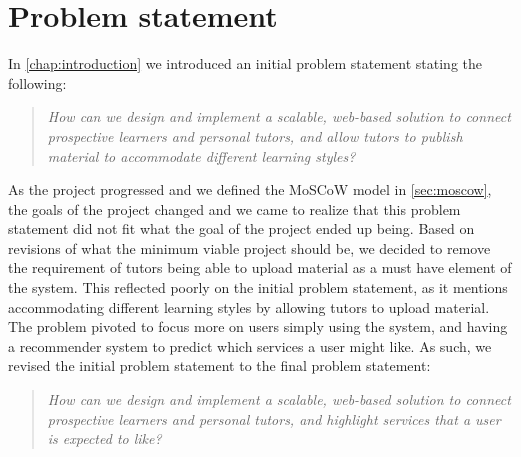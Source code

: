 \section{Problem statement}\label{sec:problemstatement}
In \autoref{chap:introduction} we introduced an initial problem statement stating the following:
\begin{quote}
    \textit{How can we design and implement a scalable, web-based solution to connect prospective learners and personal tutors, and allow tutors to publish material to accommodate different learning styles?}
\end{quote}
As the project progressed and we defined the MoSCoW model in \autoref{sec:moscow}, the goals of the project changed and we came to realize that this problem statement did not fit what the goal of the project ended up being.
Based on revisions of what the minimum viable project should be, we decided to remove the requirement of tutors being able to upload material as a must have element of the system.
This reflected poorly on the initial problem statement, as it mentions accommodating different learning styles by allowing tutors to upload material.
The problem pivoted to focus more on users simply using the system, and having a recommender system to predict which services a user might like.
As such, we revised the initial problem statement to the final problem statement:
\begin{quote}
    \textit{How can we design and implement a scalable, web-based solution to connect prospective learners and personal tutors, and highlight services that a user is expected to like?}
\end{quote}
